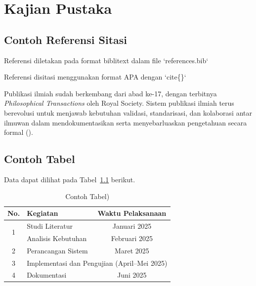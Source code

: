 
\chapter{Kajian Pustaka}

\section{Contoh Referensi Sitasi}

Referensi diletakan pada format biblitext dalam file `references.bib`

Referensi disitasi menggunakan format APA dengan `cite\{\}`

Publikasi ilmiah sudah berkembang dari abad ke-17, dengan terbitnya \textit{Philosophical Transactions} oleh Royal Society. Sistem publikasi ilmiah terus berevolusi untuk menjawab kebutuhan validasi, standarisasi, dan kolaborasi antar ilmuwan dalam mendokumentasikan serta menyebarluaskan pengetahuan secara formal (\cite{fyfe2022}).

\section{Contoh Tabel}

Data dapat dilihat pada Tabel~\ref{tab:contoh-merge} berikut.

\begin{table}[!htbp]
    \centering
    \DefaultTableFormatting                
    \caption{Contoh Tabel)}
    \begin{tabularx}{\textwidth}{|c|X|c|}
        \hline
        \rowcolor[HTML]{EFEFEF}
        \textbf{No.} & \textbf{Kegiatan} & \textbf{Waktu Pelaksanaan} \\
        \hline

        \multirow{2}{*}{1} & Studi Literatur & Januari 2025 \\
        \cline{2-3}
        & Analisis Kebutuhan & Februari 2025 \\
        \hline

        2 & Perancangan Sistem & Maret 2025 \\
        \hline

        3 & \multicolumn{2}{c|}{Implementasi dan Pengujian (April–Mei 2025)} \\
        \hline

        4 & Dokumentasi & Juni 2025 \\
        \hline
    \end{tabularx}
    \label{tab:contoh-merge}
\end{table}


